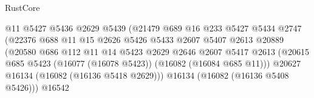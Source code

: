 \begin{lexlean}{RustCore}
\begin{coremodule}
                                              @11
                                              @5427
                                              @5436
                                              @2629
                                              @5439
                                              (@21479
                                                @689
                                                @16
                                                @233
                                                @5427
                                                @5434
                                                @2747
                                                (@22376
                                                  @688
                                                  @11
                                                  @15
                                                  @2626
                                                  @5426
                                                  @5433
                                                  @2607
                                                  @5407
                                                  @2613
                                                  @20889
                                                  (@20580
                                                    @686
                                                    @112
                                                    @11
                                                    @14
                                                    @5423
                                                    @2629
                                                    @2646
                                                    @2607
                                                    @5417
                                                    @2613
                                                    (@20615
                                                      @685
                                                      @5423
                                                      (@16077 (@16078 @5423))
                                                      (@16082 (@16084 @685 @11)))
                                                    @20627
                                                    @16134
                                                    (@16082 (@16136 @5418 @2629)))
                                                  @16134
                                                  (@16082 (@16136 @5408 @5426)))
                                                @16542

\end{coremodule}
\end{lexlean}
